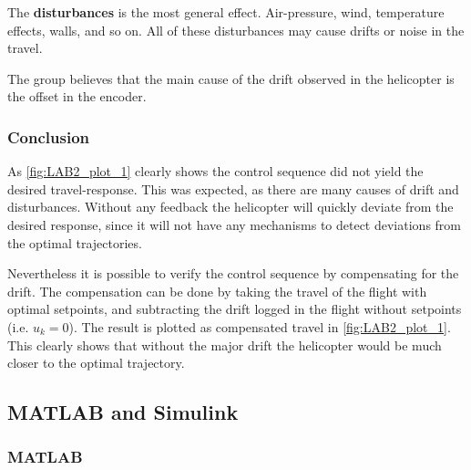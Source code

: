 \documentclass[../main.tex]{subfiles}
\begin{document}
The \textbf{disturbances} is the most general effect. Air-pressure, wind, temperature effects, walls, and so on. All of these disturbances may cause drifts or noise in the travel. 

The group believes that the main cause of the drift observed in the helicopter is the offset in the encoder.

\subsubsection{Conclusion}
As \cref{fig:LAB2_plot_1} clearly shows the control sequence did not yield the desired travel-response. This was expected, as there are many causes of drift and disturbances. Without any feedback the helicopter will quickly deviate from the desired response, since it will not have any mechanisms to detect deviations from the optimal trajectories.

Nevertheless it is possible to verify the control sequence by compensating for the drift. The compensation can be done by taking the travel of the flight with optimal setpoints, and subtracting the drift logged in the flight without setpoints (i.e. $ u_k = 0 $). The result is plotted as compensated travel in \cref{fig:LAB2_plot_1}. This clearly shows that without the major drift the helicopter would be much closer to the optimal trajectory.


\clearpage
\subsection{MATLAB and Simulink}
\subsubsection{MATLAB}

\clearpage
\end{document}
